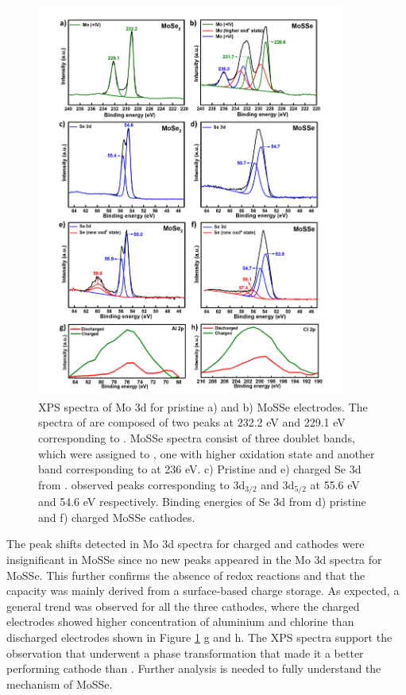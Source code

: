 \begin{figure}
  \centering
  \includegraphics[width=0.9\textwidth]{Figures/chap4fig/MoSeSeAlClPrtChg}
  \caption{XPS spectra of Mo 3d for pristine a)  and b) MoSSe electrodes. The spectra of  are composed of two peaks at 232.2 eV and 229.1 eV corresponding to . MoSSe spectra consist of three doublet bands, which were assigned to , one with higher oxidation state and another band corresponding to  at 236 eV. c) Pristine and e) charged Se 3d from .  observed peaks corresponding to 3d$_{3/2}$ and 3d$_{5/2}$ at 55.6 eV and 54.6 eV respectively. Binding energies of Se 3d from d) pristine and f) charged MoSSe cathodes.}
  \label{Figures/chap4fig:MoSeSeAlClPrtChg}
\end{figure}
The peak shifts detected in Mo 3d spectra for charged  and  cathodes were insignificant in MoSSe since no new peaks appeared in the Mo 3d spectra for MoSSe. This further confirms the absence of redox reactions and that the capacity was mainly derived from a surface-based charge storage. As expected, a general trend was observed for all the three cathodes, where the charged electrodes showed higher concentration of aluminium and chlorine than discharged electrodes shown in Figure \ref{Figures/chap4fig:MoSeSeAlClPrtChg} g and h. The XPS spectra support the observation that  underwent a phase transformation that made it a better performing cathode than . Further analysis is needed to fully understand the mechanism of MoSSe.

